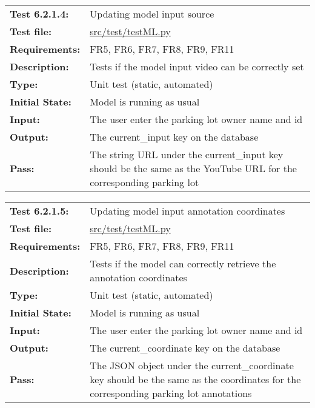 \documentclass[12pt, titlepage]{article}
\begin{document}
\vspace*{0.5 cm}


\textcolor{red}{
\begin{center}
\begin{tabular}{|l|p{10cm}|}
    \hline
    \bf{Test} 6.2.1.4: & Updating model input source \\
     \bf{Test file: } &
     \href{https://github.com/parkd-app/park-d/blob/main/test/TestML.py}{src/test/testML.py}\\
    \bf{Requirements}: & FR5, FR6, FR7, FR8, FR9, FR11 \\
    \bf{Description}: & Tests if the model input video can be correctly set\\
    \bf{Type}: & Unit test (static, automated) \\
    \bf{Initial State}: & Model is running as usual \\
    \bf{Input}: & The user enter the parking lot owner name and id \\
    \bf{Output}: & The current\_input key on the database \\
    \bf{Pass}: & The string URL under the current\_input key should be the same
    as the YouTube URL for the corresponding parking lot  \\
    \hline
\end{tabular}
\end{center}}


\vspace*{0.5 cm}


\textcolor{red}{
\begin{center}
\begin{tabular}{|l|p{10cm}|}
    \hline
    \bf{Test} 6.2.1.5: & Updating model input annotation coordinates \\
    \bf{Test file: } &
    \href{https://github.com/parkd-app/park-d/blob/main/test/TestML.py}{src/test/testML.py}\\
    \bf{Requirements}: & FR5, FR6, FR7, FR8, FR9, FR11 \\
    \bf{Description}: & Tests if the model can correctly retrieve the annotation
    coordinates\\
    \bf{Type}: & Unit test (static, automated) \\
    \bf{Initial State}: & Model is running as usual \\
    \bf{Input}: & The user enter the parking lot owner name and id \\
    \bf{Output}: & The current\_coordinate key on the database \\
    \bf{Pass}: & The JSON object under the current\_coordinate key should be the
    same as the coordinates for the corresponding parking lot annotations \\
    \hline
\end{tabular}
\end{center}}
\end{document}
